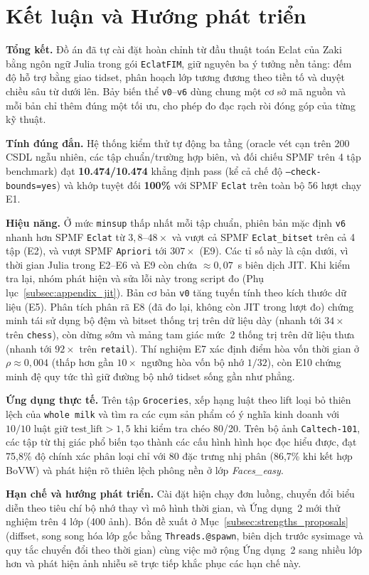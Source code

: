 \section{Kết luận và Hướng phát triển}
\label{sec:06_conclusion}

\textbf{Tổng kết.} Đồ án đã tự cài đặt hoàn chỉnh từ đầu thuật toán Eclat của Zaki~\cite{zaki2000scalable} bằng ngôn ngữ Julia trong gói \texttt{EclatFIM}, giữ nguyên ba ý tưởng nền tảng: đếm độ hỗ trợ bằng giao tidset, phân hoạch lớp tương đương theo tiền tố và duyệt chiều sâu từ dưới lên. Bảy biến thể \texttt{v0}--\texttt{v6} dùng chung một cơ sở mã nguồn và mỗi bản chỉ thêm đúng một tối ưu, cho phép đo đạc rạch ròi đóng góp của từng kỹ thuật.

\textbf{Tính đúng đắn.} Hệ thống kiểm thử tự động ba tầng (oracle vét cạn trên 200 CSDL ngẫu nhiên, các tập chuẩn/trường hợp biên, và đối chiếu SPMF trên 4 tập benchmark) đạt \textbf{10.474/10.474} khẳng định pass (kể cả chế độ \texttt{--check-bounds=yes}) và khớp tuyệt đối \textbf{100\%} với SPMF \texttt{Eclat} trên toàn bộ 56 lượt chạy E1.

\textbf{Hiệu năng.} Ở mức \texttt{minsup} thấp nhất mỗi tập chuẩn, phiên bản mặc định \texttt{v6} nhanh hơn SPMF \texttt{Eclat} từ $3{,}8$--$48\times$ và vượt cả SPMF \texttt{Eclat\_bitset} trên cả 4 tập (E2), và vượt SPMF \texttt{Apriori} tới $307\times$ (E9). Các tỉ số này là cận dưới, vì thời gian Julia trong E2--E6 và E9 còn chứa $\approx 0{,}07$~s biên dịch JIT. Khi kiểm tra lại, nhóm phát hiện và sửa lỗi này trong script đo (Phụ lục~\ref{subsec:appendix_jit}). Bản cơ bản \texttt{v0} tăng tuyến tính theo kích thước dữ liệu (E5). Phân tích phân rã E8 (đã đo lại, không còn JIT trong lượt đo) chứng minh tái sử dụng bộ đệm và bitset thống trị trên dữ liệu dày (nhanh tới $34\times$ trên \texttt{chess}), còn dừng sớm và mảng tam giác mức~2 thống trị trên dữ liệu thưa (nhanh tới $92\times$ trên \texttt{retail}). Thí nghiệm E7 xác định điểm hòa vốn thời gian ở $\rho \approx 0{,}004$ (thấp hơn gần $10\times$ ngưỡng hòa vốn bộ nhớ $1/32$), còn E10 chứng minh đệ quy tức thì giữ đường bộ nhớ tidset sống gần như phẳng.

\textbf{Ứng dụng thực tế.} Trên tập \texttt{Groceries}, xếp hạng luật theo lift loại bỏ thiên lệch của \texttt{whole milk} và tìm ra các cụm sản phẩm có ý nghĩa kinh doanh với $10/10$ luật giữ $\mathrm{test\_lift} > 1{,}5$ khi kiểm tra chéo 80/20. Trên bộ ảnh \texttt{Caltech-101}, các tập từ thị giác phổ biến tạo thành các cấu hình hình học đọc hiểu được, đạt 75,8\% độ chính xác phân loại chỉ với 80 đặc trưng nhị phân (86,7\% khi kết hợp BoVW) và phát hiện rõ thiên lệch phông nền ở lớp \emph{Faces\_easy}.

\textbf{Hạn chế và hướng phát triển.} Cài đặt hiện chạy đơn luồng, chuyển đổi biểu diễn theo tiêu chí bộ nhớ thay vì mô hình thời gian, và Ứng dụng~2 mới thử nghiệm trên 4 lớp (400 ảnh). Bốn đề xuất ở Mục~\ref{subsec:strengths_proposals} (diffset, song song hóa lớp gốc bằng \texttt{Threads.@spawn}, biên dịch trước sysimage và quy tắc chuyển đổi theo thời gian) cùng việc mở rộng Ứng dụng~2 sang nhiều lớp hơn và phát hiện ảnh nhiễu sẽ trực tiếp khắc phục các hạn chế này.
